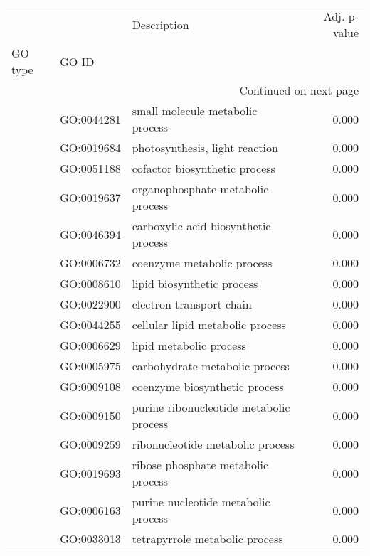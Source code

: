 \begin{longtable}{lllr}
\toprule
   &            &                                  Description &  Adj. p-value \\
GO type & GO ID &                                              &               \\
\midrule
\endhead
\midrule
\multicolumn{4}{r}{{Continued on next page}} \\
\midrule
\endfoot

\bottomrule
\endlastfoot
\multirow{198}{*}{BP} & GO:0044281 &             small molecule metabolic process &         0.000 \\
   & GO:0019684 &               photosynthesis, light reaction &         0.000 \\
   & GO:0051188 &                cofactor biosynthetic process &         0.000 \\
   & GO:0019637 &            organophosphate metabolic process &         0.000 \\
   & GO:0046394 &         carboxylic acid biosynthetic process &         0.000 \\
   & GO:0006732 &                   coenzyme metabolic process &         0.000 \\
   & GO:0008610 &                   lipid biosynthetic process &         0.000 \\
   & GO:0022900 &                     electron transport chain &         0.000 \\
   & GO:0044255 &             cellular lipid metabolic process &         0.000 \\
   & GO:0006629 &                      lipid metabolic process &         0.000 \\
   & GO:0005975 &               carbohydrate metabolic process &         0.000 \\
   & GO:0009108 &                coenzyme biosynthetic process &         0.000 \\
   & GO:0009150 &      purine ribonucleotide metabolic process &         0.000 \\
   & GO:0009259 &             ribonucleotide metabolic process &         0.000 \\
   & GO:0019693 &           ribose phosphate metabolic process &         0.000 \\
   & GO:0006163 &          purine nucleotide metabolic process &         0.000 \\
   & GO:0033013 &               tetrapyrrole metabolic process &         0.000 \\

\end{longtable}
